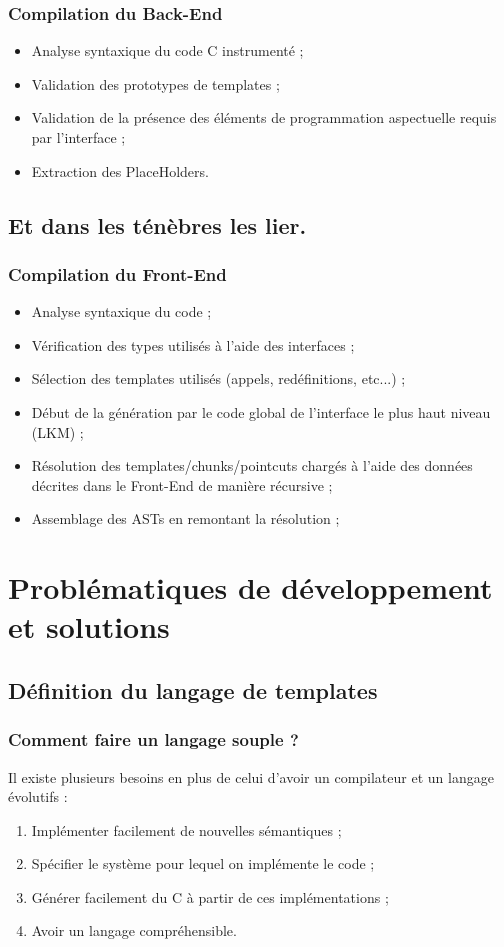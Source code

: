 \documentclass[]{beamer}
\begin{document}
\begin{frame}
\frametitle{Compilation du Back-End}
\begin{itemize}[<+->]
    \item Analyse syntaxique du code C instrumenté ;
    \item Validation des prototypes de templates ;
    \item Validation de la présence des éléments de programmation aspectuelle
            requis par l'interface ;
    \item Extraction des PlaceHolders.
\end{itemize}
\end{frame}

\subsection{Et dans les ténèbres les lier.}
\begin{frame}
\frametitle{Compilation du Front-End}
\begin{itemize}[<+->]
    \item Analyse syntaxique du code ;
    \item Vérification des types utilisés à l'aide des interfaces ;
    \item Sélection des templates utilisés (appels, redéfinitions, etc...) ;
    \item Début de la génération par le code global de l'interface le
            plus haut niveau (LKM) ;
    \item Résolution des templates/chunks/pointcuts chargés à l'aide des
            données décrites dans le Front-End de manière récursive ;
    \item Assemblage des ASTs en remontant la résolution ;
\end{itemize}
\end{frame}


\section{Problématiques de développement et solutions}

\subsection{Définition du langage de templates}
\begin{frame}
\frametitle{Comment faire un langage souple ?}
Il existe plusieurs besoins en plus de celui d'avoir un compilateur et un
langage évolutifs :
\begin{enumerate}[<+->]
    \item Implémenter facilement de nouvelles sémantiques ;
    \item Spécifier le système pour lequel on implémente le code ;
    \item Générer facilement du C à partir de ces implémentations ;
    \item Avoir un langage compréhensible.
\end{enumerate}
\end{frame}
\end{document}
